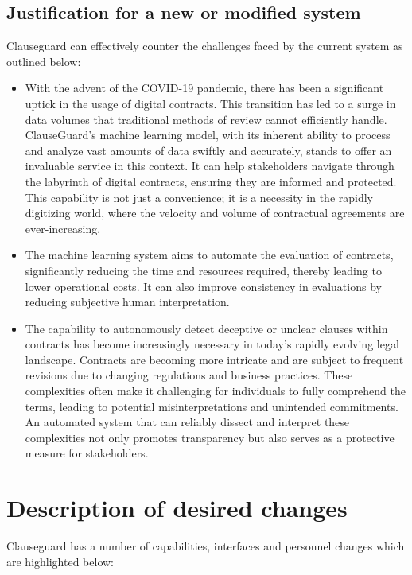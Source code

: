 \begin{itemize}
    \subsection{Justification for a new or modified system}
    Clauseguard can effectively counter the challenges faced by the current system as outlined below: 
    \begin{itemize}
        \item With the advent of the COVID-19 pandemic, there has been a significant uptick in the usage of digital contracts. This transition has led to a surge in data volumes that traditional methods of review cannot efficiently handle. ClauseGuard's machine learning model, with its inherent ability to process and analyze vast amounts of data swiftly and accurately, stands to offer an invaluable service in this context. It can help stakeholders navigate through the labyrinth of digital contracts, ensuring they are informed and protected. This capability is not just a convenience; it is a necessity in the rapidly digitizing world, where the velocity and volume of contractual agreements are ever-increasing. 
        \item The machine learning system aims to automate the evaluation of contracts, significantly reducing the time and resources required, thereby leading to lower operational costs. It can also improve consistency in evaluations by reducing subjective human interpretation.
        \item The capability to autonomously detect deceptive or unclear clauses within contracts has become increasingly necessary in today's rapidly evolving legal landscape. Contracts are becoming more intricate and are subject to frequent revisions due to changing regulations and business practices. These complexities often make it challenging for individuals to fully comprehend the terms, leading to potential misinterpretations and unintended commitments. An automated system that can reliably dissect and interpret these complexities not only promotes transparency but also serves as a protective measure for stakeholders. 
    \end{itemize}
    
\end{itemize}


\section{Description of desired changes \label{Section::Description of desired changes}}
Clauseguard has a number of capabilities, interfaces and personnel changes which are highlighted below: 

